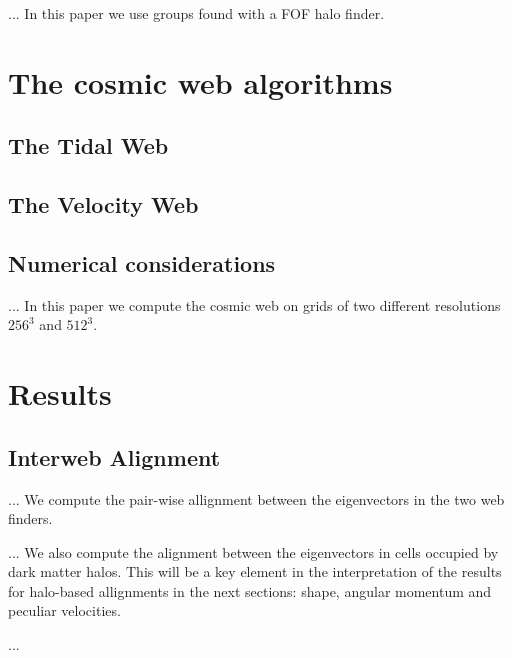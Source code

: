 \documentclass[usenatbib]{mn2e}
\begin{document}
... In this paper we use groups found with a FOF halo finder.

\section{The cosmic web algorithms}
\label{sec:algorithms}

\subsection{The Tidal Web}



\subsection{The Velocity Web}

\subsection{Numerical considerations}

... In this paper we compute the cosmic web on grids of two different
resolutions $256^3$ and $512^3$.

\section{Results}

\subsection{Interweb Alignment}
... We compute the pair-wise allignment between the eigenvectors in
the two web finders. 

... We also compute the alignment between the eigenvectors in cells
occupied by dark matter halos. This will be a key element in the
interpretation of the results for halo-based allignments in the next
sections: shape, angular momentum and peculiar velocities.

... 
\end{document}
